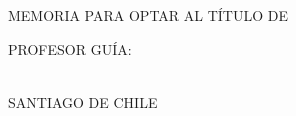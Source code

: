 \begin{center}
\vspace{4cm}

\Memtitle

\vspace{2cm}

MEMORIA PARA OPTAR AL TÍTULO DE\\
\tipomemoria

\vspace{2cm}

\Author

\vspace{1cm}
PROFESOR GUÍA:\\
\Profesor \\
\vspace{1cm}

\vfill
SANTIAGO DE CHILE\\
\Fecha
\end{center}